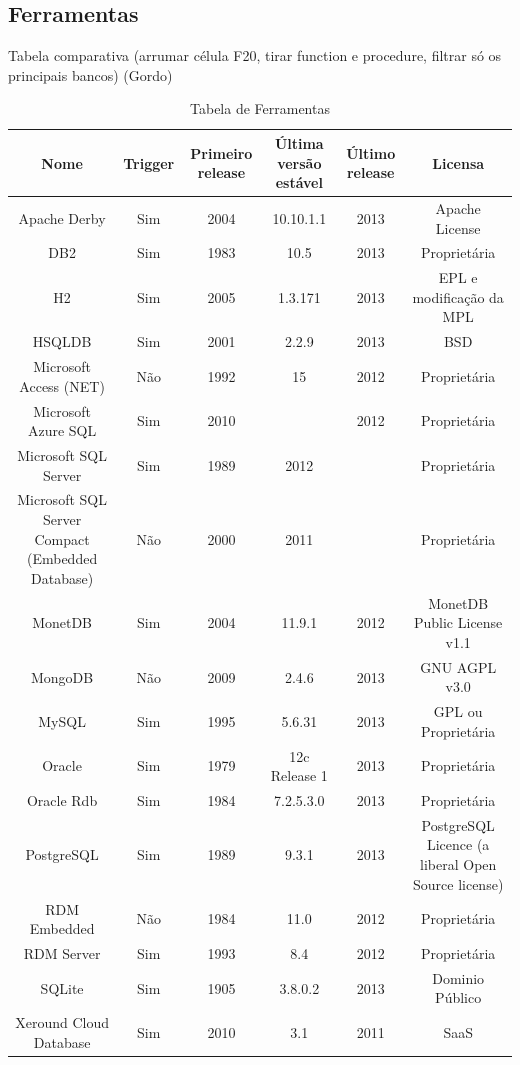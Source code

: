 \documentclass[conference]{IEEEtran}
\begin{document}
  \subsection{Ferramentas}
  Tabela comparativa (arrumar célula F20, tirar function e procedure, filtrar só os principais bancos) (Gordo)
  \begin{table}[!t]
    \renewcommand{\arraystretch}{1}
    \caption{Tabela de Ferramentas}
    \label{table_example}
    \centering
    \begin{tabular}{ c  c  c  c  c  c }
      \hline
      \bfseries Nome & \bfseries Trigger & \bfseries Primeiro release & \bfseries Última versão estável & \bfseries Último release & \bfseries Licensa \\
      \hline
      Apache Derby & Sim & 2004 & 10.10.1.1 & 2013 & Apache License \\
      \hline
      DB2 & Sim & 1983 & 10.5 & 2013 & Proprietária \\
      \hline
      H2 & Sim & 2005 & 1.3.171 & 2013 & EPL e modificação da MPL \\
      \hline
      HSQLDB & Sim & 2001 & 2.2.9 & 2013 & BSD \\
      \hline
      Microsoft Access (NET) & Não & 1992 & 15 & 2012 & Proprietária \\
      \hline
      Microsoft Azure SQL & Sim & 2010 & & 2012 & Proprietária \\
      \hline
      Microsoft SQL Server & Sim & 1989 & 2012 &  &  Proprietária \\
      \hline
      Microsoft SQL Server Compact (Embedded Database) & Não & 2000 & 2011 & & Proprietária \\
      \hline
      MonetDB & Sim & 2004 & 11.9.1 & 2012 & MonetDB Public License v1.1 \\
      \hline
      MongoDB & Não & 2009 & 2.4.6 & 2013 & GNU AGPL v3.0 \\
      \hline
      MySQL & Sim & 1995 & 5.6.31 & 2013 & GPL ou Proprietária\\
      \hline
      Oracle & Sim & 1979 & 12c Release 1 & 2013 & Proprietária\\
      \hline
      Oracle Rdb  & Sim & 1984 & 7.2.5.3.0 & 2013 & Proprietária\\
      \hline
      PostgreSQL & Sim & 1989 & 9.3.1 & 2013 & PostgreSQL Licence (a liberal Open Source license) \\
      \hline
      RDM Embedded & Não & 1984 & 11.0 & 2012 & Proprietária \\
      \hline
      RDM Server & Sim & 1993 & 8.4 & 2012 & Proprietária \\
      \hline
      SQLite & Sim & 1905 & 3.8.0.2 & 2013 & Dominio Público \\
      \hline
      Xeround Cloud Database & Sim & 2010 & 3.1 & 2011 & SaaS \\
      \hline
    \end{tabular}
  \end{table}
\end{document}
